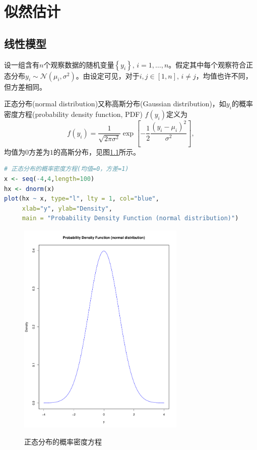 \chapter{似然估计}
\label{sec:mle-model}

\section{线性模型}
\label{sec:linear-model}

设一组含有$n$个观察数据的随机变量$\left\{ y_{i} \right\}, \, i = 1,\ldots,n$。假定其中每个观察符合正态分布$y_{i} \sim \mathcal{N} \left( \mu_{i}, \sigma^{2} \right)$。由设定可见，对于$i,j \in [1,n], \, i \neq j$，均值也许不同，但方差相同。

正态分布(normal distribution)又称高斯分布(Gaussian distribution)，如$y_{i}$的概率密度方程(probability density function, PDF) $f\left( y_{i} \right)$定义为
\begin{equation}
  \label{eq:mle-pdf-def}
  f \left( y_{i} \right) = \frac{1}{\sqrt{2 \pi \sigma^{2}}}
  \exp \left[
  - \frac{1}{2} \frac{
  \left( y_{i} - \mu_{i} \right)^{2}
  }{
  \sigma^{2}
  }
   \right],
\end{equation}
均值为$0$方差为$1$的高斯分布，见图\ref{fig:mle-pdf}所示。

\begin{lstlisting}[language=R]
# 正态分布的概率密度方程(均值=0，方差=1)
x <- seq(-4,4,length=100)
hx <- dnorm(x)
plot(hx ~ x, type="l", lty = 1, col="blue",
     xlab="y", ylab="Density",
     main = "Probability Density Function (normal distribution)")
\end{lstlisting}

\begin{figure}[htbp]
  \caption{正态分布的概率密度方程}
  \centering
  \includegraphics[width=8cm]{./Figures/20180421-pdf-function}
  \label{fig:mle-pdf}
%
\end{figure}

